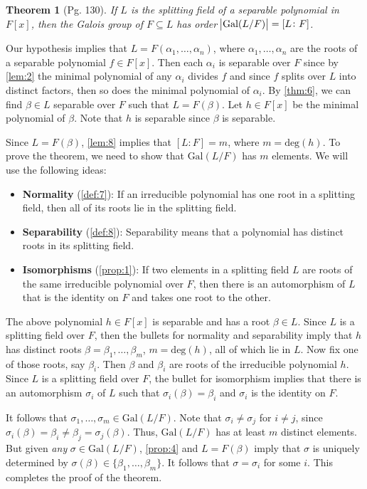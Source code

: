 \documentclass[leqno]{article}
\makeatletter
\newtheorem{theorem}{Theorem}
\theoremstyle{definition}
\theoremstyle{remark}
\let\oldproofname=\proofname
\renewcommand{\proofname}{\textit{\oldproofname}}
\theoremstyle{definition}
\renewenvironment{proof}[1][\proofname]{\par
  \pushQED{\qed}%
  \normalfont \topsep6\p@\@plus6\p@\relax
  \list{}{\leftmargin=0mm
          \rightmargin=0mm
          \settowidth{\itemindent}{\itshape#1}%
          \labelwidth=\itemindent
          \parsep=0pt \listparindent=0mm%
  }
  \item[\hskip\labelsep
        \itshape
    #1\@addpunct{.}]\ignorespaces
}{%
  \popQED\endlist\@endpefalse
}
\makeatother
\begin{document}
    \begin{theorem}[Pg. 130]\label{thm:7}
        If $L$ is the splitting field of a separable polynomial in $F[x]$, then the Galois group of $F\subseteq L$ has order $\abs{\text{Gal}(L/F)}=[L\colon F]$.
    \end{theorem}
        \begin{proof}
            Our hypothesis implies that $L=F(\alpha_1,\dots,\alpha_n)$, where $\alpha_1,\dots,\alpha_n$ are the roots of a separable polynomial $f\in F[x]$. Then each $\alpha_i$ is separable over $F$ since by \cref{lem:2} the minimal polynomial of any $\alpha_i$ divides $f$ and since $f$ splits over $L$ into distinct factors, then so does the minimal polynomial of $\alpha_i$. By \cref{thm:6}, we can find $\beta\in L$ separable over $F$ such that $L=F(\beta)$. Let $h\in F[x]$ be the minimal polynomial of $\beta$. Note that $h$ is separable since $\beta$ is separable.\par\hspace{4mm} Since $L=F(\beta)$, \cref{lem:8} implies that $[L\colon F]=m$, where $m=\text{deg}(h)$. To prove the theorem, we need to show that $\text{Gal}(L/F)$ has $m$ elements. We will use the following ideas:
                \begin{itemize}
                    \item \textbf{Normality} (\cref{def:7}): If an irreducible polynomial has one root in a splitting field, then all of its roots lie in the splitting field.
                    \item \textbf{Separability} (\cref{def:8}): Separability means that a polynomial has distinct roots in its splitting field.
                    \item \textbf{Isomorphisms} (\cref{prop:1}):  If two elements in a splitting field $L$ are roots of the same irreducible polynomial over $F$, then there is an automorphism of $L$ that is the identity on $F$ and takes one root to the other. 
                \end{itemize}
            The above polynomial $h\in F[x]$ is separable and has a root $\beta\in L$. Since $L$ is a splitting field over $F$, then the bullets for normality and separability imply that $h$ has distinct roots $\beta=\beta_1,\dots,\beta_m$, $m=\text{deg}(h)$, all of which lie in $L$. Now fix one of those roots, say $\beta_i$. Then $\beta$ and $\beta_i$ are roots of the irreducible polynomial $h$. Since $L$ is a splitting field over $F$, the bullet for isomorphism implies that there is an automorphism $\sigma_i$ of $L$ such that $\sigma_i(\beta)=\beta_i$ and $\sigma_i$ is the identity on $F$.\par\hspace{4mm} It follows that $\sigma_1,\dots,\sigma_m\in\text{Gal}(L/F)$. Note that $\sigma_i\neq\sigma_j$ for $i\neq j$, since $\sigma_i(\beta)=\beta_i\neq\beta_j=\sigma_j(\beta)$. Thus, $\text{Gal}(L/F)$ has at least $m$ distinct elements. But given \textit{any} $\sigma\in\text{Gal}(L/F)$, \cref{prop:4} and $L=F(\beta)$ imply that $\sigma$ is uniquely determined by $\sigma(\beta)\in\{\beta_1,\dots,\beta_m\}$. It follows that $\sigma=\sigma_i$ for some $i$. This completes the proof of the theorem.
        \end{proof} 
\end{document}
